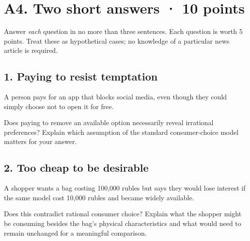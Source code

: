 \section*{A4. Two short answers · 10 points}
Answer \emph{each} question in no more than three sentences. Each question is worth 5 points. Treat these as hypothetical cases; no knowledge of a particular news article is required.
\subsection*{1. Paying to resist temptation}
A person pays for an app that blocks social media, even though they could simply choose not to open it for free.

Does paying to remove an available option necessarily reveal irrational preferences? Explain which assumption of the standard consumer-choice model matters for your answer.
\subsection*{2. Too cheap to be desirable}
A shopper wants a bag costing 100,000 rubles but says they would lose interest if the same model cost 10,000 rubles and became widely available.

Does this contradict rational consumer choice? Explain what the shopper might be consuming besides the bag's physical characteristics and what would need to remain unchanged for a meaningful comparison.
